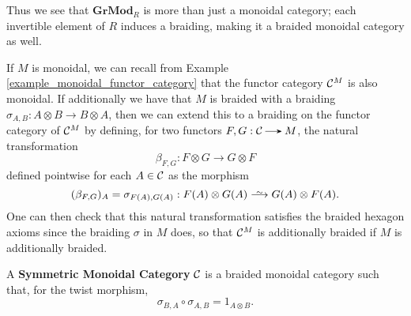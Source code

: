 \begin{example}
\begin{center}
    \end{center}
    Thus we see that $\textbf{GrMod}_R$ is more than just a monoidal category; each invertible 
    element of $R$ induces a braiding, making it a braided monoidal category as well.
\end{example}

\begin{example}
    If $M$ is monoidal, we can recall from 
    Example \ref{example_monoidal_functor_category} that the functor category 
    $\mathcal{C}^M$ is also monoidal. If additionally we have that $M$ is braided with 
    a braiding $\sigma_{A,B}: A\otimes B \to B \otimes A$,
    then we can extend this to a braiding on the functor category of $\mathcal{C}^M$ 
    by defining, for two functors $F,G: \cc \to M$, the natural transformation
    \[
        \beta_{F,G}: F \otimes G \to G \otimes F 
    \] 
    defined pointwise for each $A \in \mathcal{C}$ as the morphism
    \[
        (\beta_{F,G})_A = \sigma_{F(A), G(A)}: F(A)\otimes G(A) \isomarrow G(A) \otimes F(A). 
    \]
    One can then check that this natural transformation satisfies the braided hexagon 
    axioms since the braiding $\sigma$ in $M$ does, so that $\mathcal{C}^M$ is additionally braided 
    if $M$ is additionally braided. 
\end{example}

\begin{definition}
    A \textbf{Symmetric Monoidal Category} $\mathcal{C}$ is a braided monoidal category 
    such that, for the twist morphism, 
    \[
        \sigma_{B,A}\circ\sigma_{A,B} = 1_{A\otimes B}.
    \] 
\end{definition}

